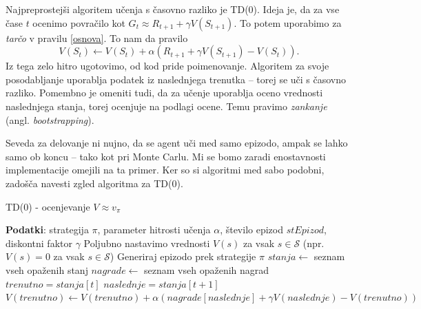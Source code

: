 \documentclass[12pt,a4paper]{amsart}
\theoremstyle{definition} %
\theoremstyle{plain} %
\begin{document}
Najpreprostejši algoritem učenja s časovno razliko je TD($0$). Ideja je, da za vse čase $t$ ocenimo
povračilo kot $G_t \approx R_{t+1} + \gamma V(S_{t+1}).$ To potem uporabimo za \textit{tarčo}
v pravilu \eqref{osnova}. To nam da pravilo
\begin{equation}
    V(S_t) \leftarrow V(S_t) + \alpha (R_{t+1} + \gamma V(S_{t+1}) - V(S_t)).
\end{equation}
Iz tega zelo hitro ugotovimo, od kod pride poimenovanje. Algoritem za svoje posodabljanje uporablja 
podatek iz naslednjega trenutka -- torej se uči s časovno razliko. Pomembno je omeniti tudi, da za 
učenje uporablja oceno vrednosti naslednjega stanja, torej ocenjuje na podlagi ocene. Temu pravimo 
\textit{zankanje} (angl. \textit{bootstrapping}). 

Seveda za delovanje ni nujno, da se agent uči med samo epizodo, ampak se lahko samo ob koncu -- tako 
kot pri Monte Carlu. Mi se bomo zaradi enostavnosti implementacije omejili na ta primer. Ker so si 
algoritmi med sabo podobni, zadošča navesti zgled algoritma za TD($0$).

\begin{algorithm}[H]
    \caption{TD($0$) - ocenjevanje  $V \approx v_\pi$}
\begin{algorithmic}
    
    \STATE \textbf{Podatki}: strategija $\pi$, parameter hitrosti učenja $\alpha$, število epizod $stEpizod$, 
            diskontni faktor $\gamma$
    \STATE 
    \STATE Poljubno nastavimo vrednosti $V(s)$ za vsak $s \in \mathcal{S}$ (npr. $V(s) = 0$ za vsak $s \in \mathcal{S}$)
    \STATE
        \STATE Generiraj epizodo prek strategije $\pi$
        \STATE $stanja \leftarrow$ seznam vseh opaženih stanj
        \STATE $nagrade \leftarrow$ seznam vseh opaženih nagrad
        \STATE
        \STATE $trenutno = stanja[t]$
        \STATE $naslednje = stanja[t + 1]$
        \STATE $V(trenutno) \leftarrow V(trenutno) + \alpha (nagrade[naslednje] + \gamma V(naslednje) - 
        V(trenutno))$ 
        \ENDFOR
    \ENDFOR

\end{algorithmic}
\end{algorithm}
\end{document}
